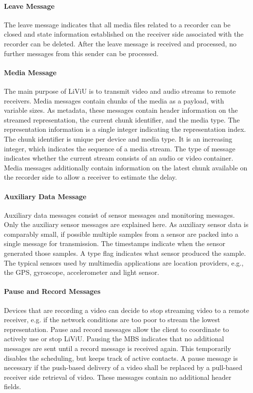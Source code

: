 \paragraph{Leave Message}
The leave message indicates that all media files related to a recorder can be closed and state information established on the receiver side associated with the recorder can be deleted.
After the leave message is received and processed, no further messages from  this sender can be processed.

\paragraph{Media Message}
The main purpose of \ac{LiViU} is to transmit video and audio streams to remote receivers.
Media messages contain chunks of the media as a payload, with variable sizes. As metadata, these messages contain header information on the streamed representation, the current chunk identifier, and the media type. The representation information is a single integer indicating the representation index. The chunk identifier is unique per device and media type. It is an increasing integer, which indicates the sequence of a media stream. The type of message indicates whether the current stream consists of an audio or video container. Media messages additionally contain information on the latest chunk available on the recorder side to allow a receiver to estimate the delay.

\paragraph{Auxiliary Data Message}
Auxiliary data messages consist of sensor messages and monitoring messages. Only the auxiliary sensor messages are explained here. 
As auxiliary sensor data is comparably small, if possible multiple samples from a sensor are packed into a single message for transmission. 
The timestamps indicate when the sensor generated those samples. 
A type flag indicates what sensor produced the sample. 
The typical sensors used by multimedia applications are location providers, e.g., the \ac{GPS}, gyroscope, accelerometer and light sensor.
\paragraph{Pause and Record Messages}
Devices that are recording a video can decide to stop streaming video to a remote receiver, e.g. if the network conditions are too poor to stream the lowest representation.
Pause and record messages allow the client to coordinate to actively use or stop \ac{LiViU}.
Pausing the \ac{MBS} indicates that no additional messages are sent until a record message is received again.
This temporarily disables the scheduling, but keeps track of active contacts.
A pause message is necessary if the push-based delivery of a video shall be replaced by a pull-based receiver side retrieval of video.
These messages contain no additional header fields.

